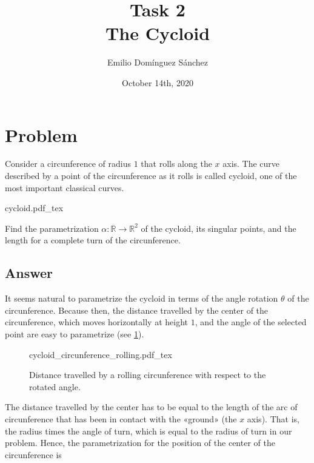 \documentclass[
    12pt, %
]{fphw}
\title{Task 2 \\ The Cycloid} %
\author{Emilio Domínguez Sánchez} %
\date{October 14th, 2020} %
\institute{University of Murcia \\ Faculty of Mathematics} %
\newcommand{\incfig}[1]{%
    \def\svgwidth{0.95\columnwidth}
    \small
        {#1.pdf_tex}
}
\newcommand{\R}{\mathbb{R}}
\begin{document}
\maketitle %


\section*{Problem}

\begin{problem}
    Consider a circunference of radius $1$ that rolls along the $x$ axis.
The curve described by a point of the circunference as it rolls is called cycloid,
one of the most important classical curves.

\begin{center}
    \incfig{cycloid}
\end{center}

    Find the parametrization $α : \R \to \R^2$ of the cycloid,
its singular points,
and the length for a complete turn of the circunference.
\end{problem}


\subsection*{Answer}

    It seems natural to parametrize the cycloid in terms of
the angle rotation $θ$ of the circunference.
Because then,
the distance travelled by the center of the circunference,
which moves horizontally at height $1$,
and the angle of the selected point are easy to parametrize
(see \cref{fig-distance-by-angle}).

\begin{figure}[h]
    \incfig{cycloid_circunference_rolling}
    \caption{Distance travelled by a rolling circunference
    with respect to the rotated angle.}
    \label{fig-distance-by-angle}
\end{figure}

\noindent
The distance travelled by the center has to be equal to
the length of the arc of circunference that has been in contact with the «ground»
(the $x$ axis).
That is, the radius times the angle of turn,
which is equal to the radius of turn in our problem.
Hence, the parametrization for the position of the center of the circunference is
\end{document}
